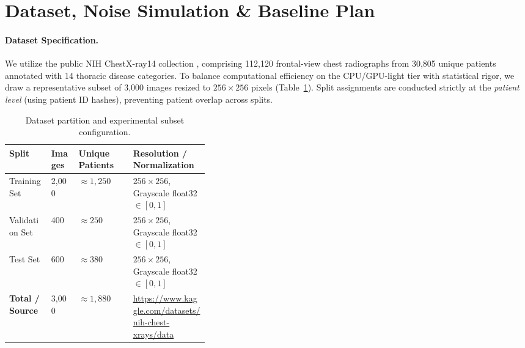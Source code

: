 \documentclass[11pt]{article}
\begin{document}
\section{Dataset, Noise Simulation \& Baseline Plan}
\label{sec:data}

\paragraph{Dataset Specification.}
We utilize the public NIH ChestX-ray14 collection \citep{wang2017chestxray8}, comprising 112{,}120 frontal-view chest radiographs from 30{,}805 unique patients annotated with 14 thoracic disease categories. To balance computational efficiency on the CPU/GPU-light tier with statistical rigor, we draw a representative subset of 3{,}000 images resized to $256 \times 256$ pixels (Table~\ref{tab:data}). Split assignments are conducted strictly at the \emph{patient level} (using patient ID hashes), preventing patient overlap across splits.

\begin{table}[h]
\centering
\caption{Dataset partition and experimental subset configuration.}
\label{tab:data}
\begin{tabular}{@{}lllp{0.38\linewidth}@{}}
\toprule
\textbf{Split} & \textbf{Images} & \textbf{Unique Patients} & \textbf{Resolution / Normalization} \\
\midrule
Training Set   & 2{,}000 & $\approx 1{,}250$ & $256 \times 256$, Grayscale float32 $\in [0, 1]$ \\
Validation Set & 400   & $\approx 250$   & $256 \times 256$, Grayscale float32 $\in [0, 1]$ \\
Test Set       & 600   & $\approx 380$   & $256 \times 256$, Grayscale float32 $\in [0, 1]$ \\
\midrule
\textbf{Total / Source} & 3{,}000 & $\approx 1{,}880$ & \url{https://www.kaggle.com/datasets/nih-chest-xrays/data} \\
\bottomrule
\end{tabular}
\end{table}
\end{document}
